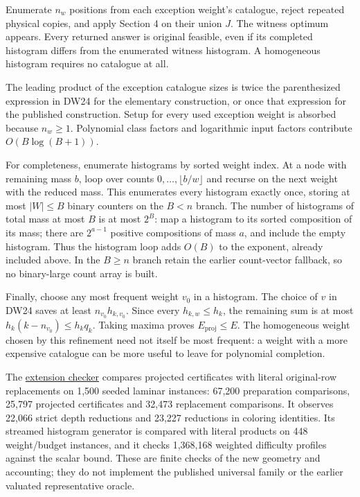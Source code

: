 Enumerate \(n_w\) positions from each exception weight's catalogue, reject repeated physical copies, and apply Section 4 on their union \(J\). The witness optimum appears. Every returned answer is original feasible, even if its completed histogram differs from the enumerated witness histogram. A homogeneous histogram requires no catalogue at all.

The leading product of the exception catalogue sizes is twice the parenthesized expression in DW24 for the elementary construction, or once that expression for the published construction. Setup for every used exception weight is absorbed because \(n_w\ge1\). Polynomial class factors and logarithmic input factors contribute \(O(B\log(B+1))\).

For completeness, enumerate histograms by sorted weight index. At a node with remaining mass \(b\), loop over counts \(0,\ldots,\lfloor b/w\rfloor\) and recurse on the next weight with the reduced mass. This enumerates every histogram exactly once, storing at most \(|W|\le B\) binary counters on the \(B<n\) branch. The number of histograms of total mass at most \(B\) is at most \(2^B\): map a histogram to its sorted composition of its mass; there are \(2^{a-1}\) positive compositions of mass \(a\), and include the empty histogram. Thus the histogram loop adds \(O(B)\) to the exponent, already included above. In the \(B\ge n\) branch retain the earlier count-vector fallback, so no binary-large count array is built.

Finally, choose any most frequent weight \(v_0\) in a histogram. The choice of \(v\) in DW24 saves at least \(n_{v_0}h_{k,v_0}\). Since every \(h_{k,w}\le h_k\), the remaining sum is at most \(h_k(k-n_{v_0})\le h_kq_k\). Taking maxima proves \(E_{\mathrm{proj}}\le E\). The homogeneous weight chosen by this refinement need not itself be most frequent: a weight with a more expensive catalogue can be more useful to leave for polynomial completion.

The \href{https://github.com/icekylinx/algorithm-frontier/blob/main/problems/weighted-prefix-quota-frontier/verify/check_quota_extensions.py}{extension checker} compares projected certificates with literal original-row replacements on 1,500 seeded laminar instances: 67,200 preparation comparisons, 25,797 projected certificates and 32,473 replacement comparisons. It observes 22,066 strict depth reductions and 23,227 reductions in coloring identities. Its streamed histogram generator is compared with literal products on 448 weight/budget instances, and it checks 1,368,168 weighted difficulty profiles against the scalar bound. These are finite checks of the new geometry and accounting; they do not implement the published universal family or the earlier valuated representative oracle.


